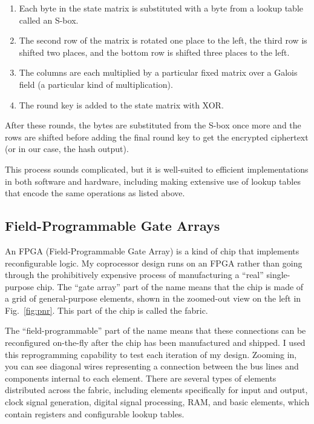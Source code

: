 \begin{enumerate}
	\item Each byte in the state matrix is substituted with a byte from a lookup table called an S-box.
	\item The second row of the matrix is rotated one place to the left, the third row is shifted two places, and the bottom row is shifted three places to the left.
	\item The columns are each multiplied by a particular fixed matrix over a Galois field (a particular kind of multiplication).
	\item The round key is added to the state matrix with XOR.
\end{enumerate}

After these rounds, the bytes are substituted from the S-box once more and the rows are shifted before adding the final round key to get the encrypted ciphertext (or in our case, the hash output).

This process sounds complicated, but it is well-suited to efficient implementations in both software and hardware, including making extensive use of lookup tables that encode the same operations as listed above.

\subsection{Field-Programmable Gate Arrays}
An FPGA (Field-Programmable Gate Array) is a kind of chip that implements reconfigurable logic. My coprocessor design runs on an FPGA rather than going through the prohibitively expensive process of manufacturing a ``real'' single-purpose chip. The ``gate array'' part of the name means that the chip is made of a grid of general-purpose elements, shown in the zoomed-out view on the left in Fig.~\ref{fig:pnr}. This part of the chip is called the fabric.

The ``field-programmable'' part of the name means that these connections can be reconfigured on-the-fly after the chip has been manufactured and shipped. I used this reprogramming capability to test each iteration of my design. Zooming in, you can see diagonal wires representing a connection between the bus lines and components internal to each element. There are several types of elements distributed across the fabric, including elements specifically for input and output, clock signal generation, digital signal processing, RAM, and basic elements, which contain registers and configurable lookup tables.

